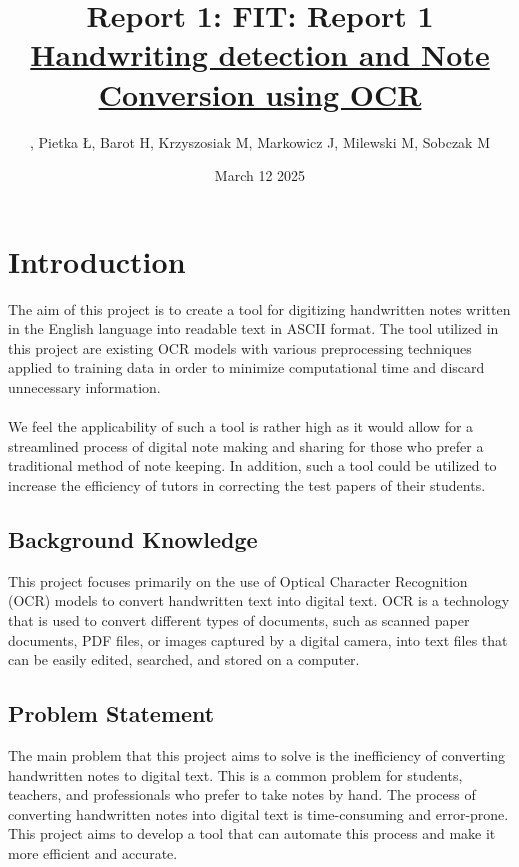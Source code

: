 \documentclass[twoside,a4paper]{article}
\title{Report 1: }
\title{\textbf{FIT: Report 1} \\[1ex] \Large \underline{Handwriting detection and Note Conversion using OCR}
}
\author{, Pietka Ł, Barot H, Krzyszosiak M, Markowicz J, Milewski M, Sobczak M}
\date{March 12 2025}
\begin{document}
\maketitle
\tableofcontents
\newpage
\section{Introduction}
The aim of this project is to create a tool for digitizing handwritten notes written in the English language into readable text in ASCII format. The tool utilized in this project are existing OCR models with various preprocessing techniques applied to training data in order to minimize computational time and discard unnecessary information. \\\\
We feel the applicability of such a tool is rather high as it would allow for a streamlined process of digital note making and sharing for those who prefer a traditional method of note keeping. In addition, such a tool could be utilized to increase the efficiency of tutors in correcting the test papers of their students.

\subsection{Background Knowledge}
This project focuses primarily on the use of Optical Character Recognition (OCR) models to convert handwritten text into digital text. 
OCR is a technology that is used to convert different types of documents, such as scanned paper documents, PDF files, or images captured by a digital camera, into text files that can be easily edited, searched, and stored on a computer.\\




\subsection{Problem Statement}
The main problem that this project aims to solve is the inefficiency of converting handwritten notes to digital text. 
This is a common problem for students, teachers, and professionals who prefer to take notes by hand. 
The process of converting handwritten notes into digital text is time-consuming and error-prone. 
This project aims to develop a tool that can automate this process and make it more efficient and accurate. \\
 
\end{document}
